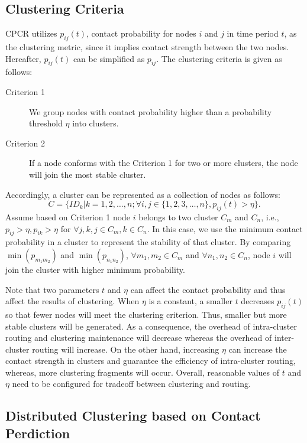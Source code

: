 \documentclass[conference]{IEEEtran}
\begin{document}
\subsection{Clustering Criteria}
\label{section_label_clustering_criterion}
CPCR utilizes $p_{ij}(t)$, contact probability for nodes $i$ and $j$ in time period $t$, as the clustering metric, since it implies contact strength between the two nodes. Hereafter, $p_{ij}(t)$ can be simplified as $p_{ij}$. The clustering criteria is given as follows:
\begin{description}
  \item[Criterion 1] We group nodes with contact probability higher than a probability threshold $\eta$ into clusters.
  \item[Criterion 2] If a node conforms with the Criterion 1 for two or more clusters, the node will join the most stable cluster.
\end{description}
Accordingly, a cluster can be represented as a collection of nodes as follows:
    \begin{equation}\label{equation_collections}
          C= \{ ID_{k} | k=1,2,\dots,n;\forall i,j\in \{1,2,3,\dots,n\},p_{ij}(t)>\eta\}.
    \end{equation}
Assume based on Criterion 1 node $i$ belongs to two cluster $C_m$ and $C_n$, i.e., $p_{ij}>\eta, p_{ik}>\eta$ for ${\forall j,k, j \in C_m, k \in C_n}$.  In this case, we use the minimum contact probability in a cluster to represent the stability of that cluster. By comparing $\min(p_{m_1m_2})$ and $\min(p_{n_1n_2})$, $\forall m_1,m_2 \in C_m$ and $\forall n_1,n_2 \in C_n$, node $i$ will join the cluster with higher minimum probability.

Note that two parameters $t$ and $\eta$ can affect the contact probability and thus affect the results of clustering. When $\eta$ is a constant, a smaller $t$ decreases $p_{ij}(t)$ so that fewer nodes will meet the clustering criterion. Thus, smaller but more stable
clusters will be generated. As a consequence, the overhead of intra-cluster routing and clustering maintenance will decrease whereas the overhead of inter-cluster routing will increase. On the other hand, increasing $\eta$ can increase the contact strength in clusters and guarantee the efficiency of intra-cluster routing, whereas, more clustering fragments will occur. Overall, reasonable values of $t$ and $\eta$ need to be configured for tradeoff between clustering and routing.



\subsection{Distributed Clustering  based on Contact Perdiction}
\label{section_label_clustering_procedure}
\end{document}
